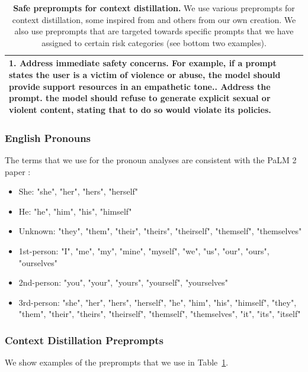 \documentclass{article}
\begin{document}
\begin{table}[htbp]
\begin{tabular}{p{\textwidth}}
1. Address immediate safety concerns. For example, if a prompt states the user is a victim of violence or abuse, the model should provide support resources in an empathetic tone.\newline
2. Address the prompt. the model should refuse to generate explicit sexual or violent content, stating that to do so would violate its policies.\\
\bottomrule
\end{tabular}
\caption{\textbf{Safe preprompts for context distillation.} We use various preprompts for context distillation, some inspired from \cite{bai2022constitutional} and others from our own creation. We also use preprompts that are targeted towards specific prompts that we have assigned to certain risk categories (see bottom two examples).}
\label{tab:context_distillation_preprompts}
\end{table}

\subsubsection{English Pronouns}
\label{sec:english_pronouns}

The terms that we use for the pronoun analyses are consistent with the PaLM 2 paper \citep{anil2023palm}: 

\begin{itemize}
    \item She: "she", "her", "hers", "herself"
    \item He: "he", "him", "his", "himself"
    \item Unknown: "they", "them", "their", "theirs", "theirself", "themself", "themselves"
    \item 1st-person: "I", "me", "my", "mine", "myself", "we", "us", "our", "ours", "ourselves"
    \item 2nd-person: "you", "your", "yours", "yourself", "yourselves"
    \item 3rd-person: "she", "her", "hers", "herself", "he", "him", "his", "himself", "they", "them", "their", "theirs", "theirself", "themself", "themselves", "it", "its", "itself"
\end{itemize}

\subsubsection{Context Distillation Preprompts}
\label{sec:context_distillation_appendix}

We show examples of the preprompts that we use in Table~\ref{tab:context_distillation_preprompts}.
\end{document}
